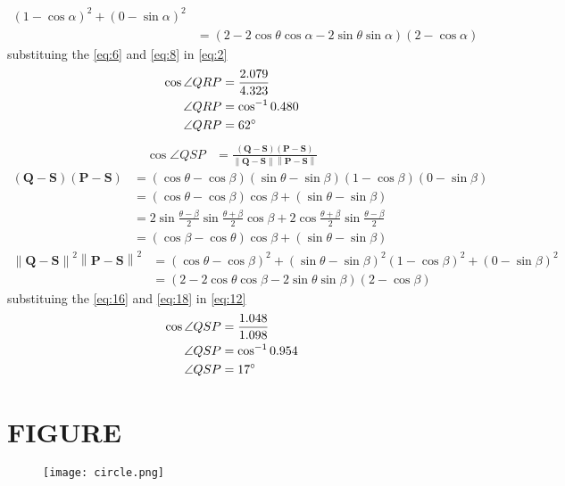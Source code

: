 \documentclass[12pt]{article}
\providecommand{\brak}[1]{\ensuremath{\left(#1\right)}}
\providecommand{\norm}[1]{\left\lVert#1\right\rVert}
\let\vec\mathbf
\begin{document}
\begin{enumerate}
\begin{align}
	\brak{1-\cos\alpha}^2+\brak{0-\sin\alpha}^2\\
	&=\brak{2-2\cos\theta\cos\alpha-2\sin\theta\sin\alpha}\brak{2-\cos\alpha}\label{eq:8}
\end{align}
substituing the \eqref{eq:6} and \eqref{eq:8} in \eqref{eq:2}
\begin{align}
\cos\angle QRP&=\frac{2.079}{4.323}\\
\angle QRP&=\cos^{-1}0.480\\
\angle QRP&=62\degree
\end{align}
\begin{align}
\cos\angle QSP&= \frac{\brak{\vec{Q}-\vec{S}}\brak{\vec{P}-\vec{S}}}{\norm{\vec{Q}-\vec{S}}\norm{\vec{P}-\vec{S}}}\label{eq:12}
\end{align}
\begin{align}
\brak{\vec{Q}-\vec{S}}\brak{\vec{P}-\vec{S}}&= \brak{\cos\theta-\cos\beta}\brak{\sin\theta-\sin\beta}\brak{1-\cos\beta}\brak{0-\sin\beta}\\
&=\brak{\cos\theta-\cos\beta}\cos\beta+\brak{\sin\theta-\sin\beta}\\
&=2\sin\frac{\theta-\beta}{2}\sin\frac{\theta+\beta}{2}\cos\beta+2\cos\frac{\theta+\beta}{2}\sin\frac{\theta-\beta}{2}\\
&=\brak{\cos\beta-\cos\theta}\cos\beta+\brak{\sin\theta-\sin\beta}\label{eq:16}
\end{align}
\begin{align}
\norm{\vec{Q}-\vec{S}}^2\norm{\vec{P}-\vec{S}}^2 &= \brak{\cos\theta-\cos\beta}^2+\brak{\sin\theta-\sin\beta}^2
	\brak{1-\cos\beta}^2+\brak{0-\sin\beta}^2\\
	&=\brak{2-2\cos\theta\cos\beta-2\sin\theta\sin\beta}\brak{2-\cos\beta}\label{eq:18}
\end{align}
substituing the \eqref{eq:16} and \eqref{eq:18} in \eqref{eq:12}
\begin{align}
\cos\angle QSP&=\frac{1.048}{1.098}\\
\angle QSP&=\cos^{-1}0.954\\
\angle QSP&=17\degree
\end{align}
\section{FIGURE}
\begin{figure}[h]
\centering
\texttt{[image: circle.png]}
\caption{}
		\label{fig:Figure}
\end{figure}
\end{enumerate}
\end{document}
